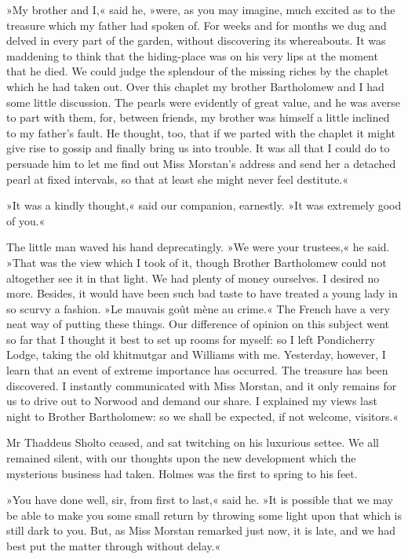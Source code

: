 »My brother and I,« said he, »were, as you may imagine, much excited as to the treasure which my father had spoken of. For weeks and for months we dug and delved in every part of the garden, without discovering its whereabouts. It was maddening to think that the hiding-place was on his very lips at the moment that he died. We could judge the splendour of the missing riches by the chaplet which he had taken out. Over this chaplet my brother Bartholomew and I had some little discussion. The pearls were evidently of great value, and he was averse to part with them, for, between friends, my brother was himself a little inclined to my father's fault. He thought, too, that if we parted with the chaplet it might give rise to gossip and finally bring us into trouble. It was all that I could do to persuade him to let me find out Miss Morstan's address and send her a detached pearl at fixed intervals, so that at least she might never feel destitute.«

»It was a kindly thought,« said our companion, earnestly. »It was extremely good of you.«

The little man waved his hand deprecatingly. »We were your trustees,« he said. »That was the view which I took of it, though Brother Bartholomew could not altogether see it in that light. We had plenty of money ourselves. I desired no more. Besides, it would have been such bad taste to have treated a young lady in so scurvy a fashion. »\textfrench{Le mauvais goût mène au crime.}« The French have a very neat way of putting these things. Our difference of opinion on this subject went so far that I thought it best to set up rooms for myself: so I left Pondicherry Lodge, taking the old khitmutgar and Williams with me. Yesterday, however, I learn that an event of extreme importance has occurred. The treasure has been discovered. I instantly communicated with Miss Morstan, and it only remains for us to drive out to Norwood and demand our share. I explained my views last night to Brother Bartholomew: so we shall be expected, if not welcome, visitors.«

Mr Thaddeus Sholto ceased, and sat twitching on his luxurious settee. We all remained silent, with our thoughts upon the new development which the mysterious business had taken. Holmes was the first to spring to his feet.

»You have done well, sir, from first to last,« said he. »It is possible that we may be able to make you some small return by throwing some light upon that which is still dark to you. But, as Miss Morstan remarked just now, it is late, and we had best put the matter through without delay.«

